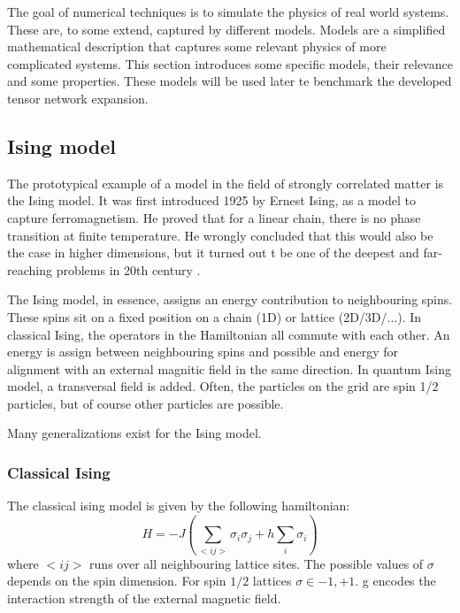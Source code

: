 The goal of numerical techniques is to simulate the physics of real world systems. These are, to some extend, captured by different models. Models are a simplified mathematical description that captures some relevant physics of more complicated systems. This section introduces some specific models, their relevance and some properties. These models will be used later te benchmark the developed tensor network expansion.

\subsection{Ising model}

The prototypical example of a model in the field of strongly correlated matter is the Ising model. It was first introduced 1925 by Ernest Ising, as a model to capture ferromagnetism. He proved that for a linear chain, there is no phase transition at finite temperature. He wrongly concluded that this would also be the case in higher dimensions, but it turned out t be one of the deepest and far-reaching problems in 20th century \cite{Taroni2015}.

The Ising model, in essence, assigns an energy contribution to neighbouring spins. These spins sit on a fixed position on a chain (1D) or lattice (2D/3D/...). In classical Ising, the operators in the Hamiltonian all commute with each other. An energy is assign between neighbouring spins and possible and energy for alignment with an external magnitic field in the same direction. In quantum Ising model, a transversal field is added. Often, the particles on the grid are spin 1/2 particles, but of course other particles are possible.

Many generalizations exist for the Ising model. 

\subsubsection{Classical Ising}

The classical ising model is given by the following hamiltonian:
\begin{equation}
    H = -J \left (  \sum_{<i j>} \sigma_i \sigma_j + h \sum_i \sigma_i \right )
\end{equation}
where $<i j>$ runs over all neighbouring lattice sites. The possible values of $\sigma$ depends on the spin dimension. For spin $1/2$ lattices $\sigma \in {-1,+1}$. g encodes the interaction strength of the external magnetic field.

